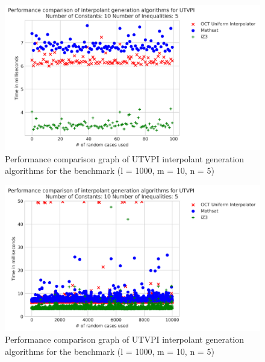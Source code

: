 \begin{figure}[!ht]
  \centering
  \includegraphics[scale=0.6]{figures/octi_performance_graph_10_5_100}
  \caption{Performance comparison graph of UTVPI interpolant generation
  algorithms for the benchmark (l = 1000, m = 10, n = 5)}
  \label{performance_graph_oct}
\end{figure}

\begin{figure}[!ht]
  \centering
  \includegraphics[scale=0.6]{figures/octi_performance_graph_10_5_10000}
  \caption{Performance comparison graph of UTVPI interpolant generation
  algorithms for the benchmark (l = 1000, m = 10, n = 5)} 

  \label{performance_graph_oct_2}
\end{figure}

